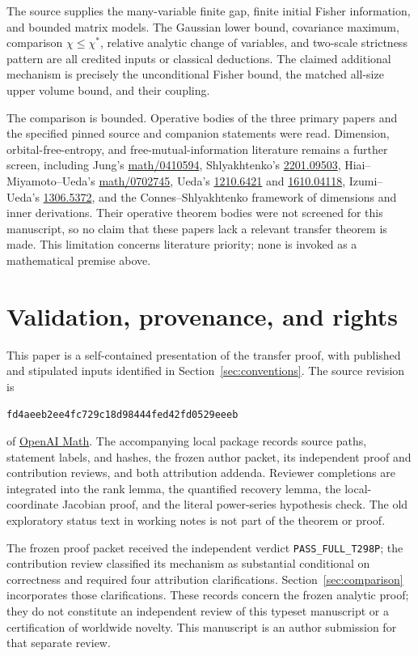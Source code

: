 \documentclass[11pt]{article}
\theoremstyle{definition}\newtheorem{definition}[theorem]{Definition}
\theoremstyle{remark}\newtheorem{remark}[theorem]{Remark}
\newcommand{\pin}{\texttt{fd4aeeb2ee4fc729c18d98444fed42fd0529eeeb}}
\begin{document}
The source \cite{source298} supplies the many-variable finite gap,
finite initial Fisher information, and bounded matrix models. The
Gaussian lower bound, covariance maximum, comparison $\chi\leq\chi^*$,
relative analytic change of variables, and two-scale strictness
pattern are all credited inputs or classical deductions. The claimed
additional mechanism is precisely the unconditional Fisher bound,
the matched all-size upper volume bound, and their coupling.

The comparison is bounded. Operative bodies of the three primary
papers \cite{Shly,NSSentropy,NSSfisher} and the specified pinned source
and companion statements were read. Dimension, orbital-free-entropy,
and free-mutual-information literature remains a further screen,
including Jung's \href{https://arxiv.org/abs/math/0410594}{math/0410594},
Shlyakhtenko's \href{https://arxiv.org/abs/2201.09503}{2201.09503},
Hiai--Miyamoto--Ueda's
\href{https://arxiv.org/abs/math/0702745}{math/0702745}, Ueda's
\href{https://arxiv.org/abs/1210.6421}{1210.6421} and
\href{https://arxiv.org/abs/1610.04118}{1610.04118},
Izumi--Ueda's \href{https://arxiv.org/abs/1306.5372}{1306.5372}, and the
Connes--Shlyakhtenko framework of dimensions and inner derivations. Their
operative theorem bodies were not screened for this manuscript, so
no claim that these papers lack a relevant transfer theorem is made.
This limitation concerns literature priority; none is invoked as a
mathematical premise above.

\appendix
\section{Validation, provenance, and rights}
\label{app:provenance}
This paper is a self-contained presentation of the transfer proof,
with published and stipulated inputs identified in
Section~\ref{sec:conventions}. The source revision is
\begin{center}\small\pin\end{center}
of \href{https://github.com/openai/math}{OpenAI Math}.
The accompanying local package records source paths, statement labels,
and hashes, the frozen author packet, its independent proof and
contribution reviews, and both attribution addenda. Reviewer completions
are integrated into the rank lemma, the quantified recovery lemma,
the local-coordinate Jacobian proof, and the literal power-series
hypothesis check. The old exploratory status text in working notes
is not part of the theorem or proof.

The frozen proof packet received the independent verdict
\texttt{PASS\_FULL\_T298P}; the contribution review classified its
mechanism as substantial conditional on correctness and required four
attribution clarifications. Section~\ref{sec:comparison} incorporates
those clarifications. These records concern the frozen analytic proof;
they do not constitute an independent review of this typeset manuscript
or a certification of worldwide novelty. This manuscript is an author
submission for that separate review.
\end{document}
